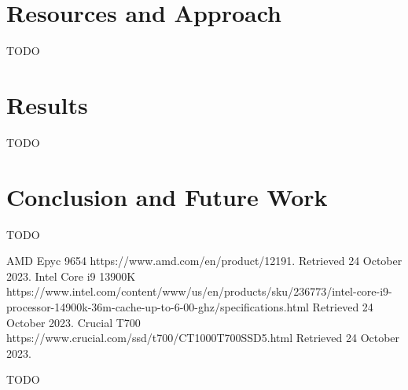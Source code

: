 \documentclass[12pt]{article}
\begin{document}
	\section{Resources and Approach}
	TODO
	\section{Results}
	TODO
	\section{Conclusion and Future Work}
	TODO

	\begin{thebibliography}{9}
		AMD Epyc 9654 https://www.amd.com/en/product/12191. Retrieved 24 October 2023.
		Intel Core i9 13900K https://www.intel.com/content/www/us/en/products/sku/236773/intel-core-i9-processor-14900k-36m-cache-up-to-6-00-ghz/specifications.html Retrieved 24 October 2023.
		Crucial T700 https://www.crucial.com/ssd/t700/CT1000T700SSD5.html Retrieved 24 October 2023.
	\end{thebibliography}
	TODO
\end{document}
